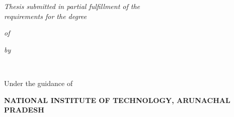 \thispagestyle{empty}
\begin{center}
    { \large {\bfseries {\mytitle}} \par}
\vspace{3\baselineskip}
    {\textit{Thesis submitted in partial fulfillment of the}\\
    \textit{requirements for the degree}}\par
\vspace{\baselineskip}
    {\textit{of} \par}
\vspace{\baselineskip}
    {\large \bf \mydegree \par} 
\vspace{\baselineskip}
    {\textit{by} \par}
\vspace{\baselineskip}
    {{\large {\bf \myname \\ \myrollno}} \par}
\vspace{1.5\baselineskip}
    {Under the guidance of \par}
\vspace{\baselineskip}
    {{\large \bf \mysupervisor} \par}
\vspace{1.5\baselineskip}
    {\begin{figure}[!h] 
	\centering
     \end{figure}
    }
\vspace{1.5\baselineskip}
    {\bf \MakeUppercase{\mydep} \par}
\vspace*{1ex}
    {\bf \uppercase{National Institute of Technology, Arunachal Pradesh} \par}
\vspace*{1ex}
    {\bf \mydegreedate \par}
 \end{center}
